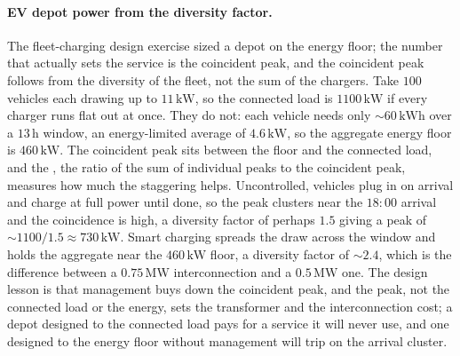 \paragraph{EV depot power from the diversity factor.} The fleet-charging
design exercise sized a depot on the energy floor; the number that actually
sets the service is the coincident peak, and the coincident peak follows from
the diversity of the fleet, not the sum of the chargers. Take $100$ vehicles
each drawing up to $11\,\si{\kilo\watt}$, so the connected load is $1100\,\si{
\kilo\watt}$ if every charger runs flat out at once. They do not: each vehicle
needs only $\sim 60\,\si{\kilo\watt\hour}$ over a $13\,\si{\hour}$ window, an
energy-limited average of $4.6\,\si{\kilo\watt}$, so the aggregate energy
floor is $460\,\si{\kilo\watt}$. The coincident peak sits between the floor
and the connected load, and the , the ratio of the
sum of individual peaks to the coincident peak, measures how much the
staggering helps. Uncontrolled, vehicles plug in on arrival and charge at
full power until done, so the peak clusters near the $18{:}00$ arrival and the
coincidence is high, a diversity factor of perhaps $1.5$ giving a peak of
$\sim 1100/1.5 \approx 730\,\si{\kilo\watt}$. Smart charging spreads the
draw across the window and holds the aggregate near the $460\,\si{\kilo\watt}$
floor, a diversity factor of $\sim 2.4$, which is the difference between a
$0.75\,\si{\mega\watt}$ interconnection and a $0.5\,\si{\mega\watt}$ one. The
design lesson is that management buys down the coincident peak, and the peak,
not the connected load or the energy, sets the transformer and the
interconnection cost; a depot designed to the connected load pays for a
service it will never use, and one designed to the energy floor without
management will trip on the arrival cluster.

